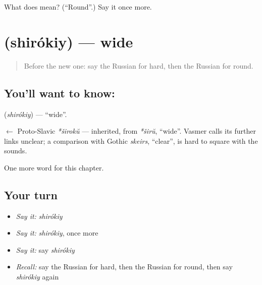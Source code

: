 \begin{tcolorbox}[breakable,colback=teal!4,colframe=teal!35!black,title={Before you move on}]
What does  mean? (\textquotedblleft{}Round\textquotedblright{}.) Say it once more.
\end{tcolorbox}
\section[\texorpdfstring{\ru{широкий} (shirókiy)}{широкий (shirókiy)}]{ (shirókiy) — wide}

\label{lesson:RU-C129-wide}



\begin{quote}
Before the new one: say the Russian for hard, then the Russian for round.
\end{quote}

\subsection*{You'll want to know: }
\textbf{} (\emph{shirókiy}) — \textquotedblleft{}wide\textquotedblright{}.

\begin{cousinweb}
\textbf{} $\leftarrow$ Proto-Slavic \emph{*širokŭ} — inherited, from \emph{*širŭ}, \textquotedblleft{}wide\textquotedblright{}. Vasmer calls its further links unclear; a comparison with Gothic \emph{skeirs}, \textquotedblleft{}clear\textquotedblright{}, is hard to square with the sounds.
\end{cousinweb}

\begin{grammarlens}[title={What you've built}]
One more word for this chapter.
\end{grammarlens}

\subsection*{Your turn}
\begin{itemize}
\raggedright
  \item \emph{Say it:} \emph{shirókiy}
  \item \emph{Say it:} \emph{shirókiy}, once more
  \item \emph{Say it:} say \emph{shirókiy}
  \item \emph{Recall:} say the Russian for hard, then the Russian for round, then say \emph{shirókiy} again
\end{itemize}

